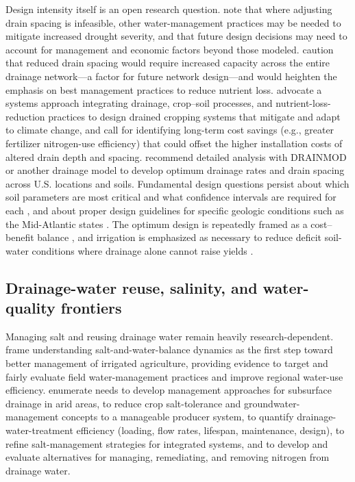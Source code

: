 Design intensity itself is an open research question. \textcite{Dialameh2025} note that where adjusting drain spacing is infeasible, other water-management practices may be needed to mitigate increased drought severity, and that future design decisions may need to account for management and economic factors beyond those modeled. \textcite{Singh2009} caution that reduced drain spacing would require increased capacity across the entire drainage network---a factor for future network design---and would heighten the emphasis on best management practices to reduce nutrient loss. \textcite{Castellano2019} advocate a systems approach integrating drainage, crop--soil processes, and nutrient-loss-reduction practices to design drained cropping systems that mitigate and adapt to climate change, and call for identifying long-term cost savings (e.g., greater fertilizer nitrogen-use efficiency) that could offset the higher installation costs of altered drain depth and spacing. \textcite{Strock2011} recommend detailed analysis with DRAINMOD or another drainage model to develop optimum drainage rates and drain spacing across U.S. locations and soils. Fundamental design questions persist about which soil parameters are most critical and what confidence intervals are required for each \parencite{Ayars2015}, and about proper design guidelines for specific geologic conditions such as the Mid-Atlantic states \parencite{SHIRMOHAMMADI1995}. The optimum design is repeatedly framed as a cost--benefit balance \parencite{HARDJOAMIDJOJO1982}, and irrigation is emphasized as necessary to reduce deficit soil-water conditions where drainage alone cannot raise yields \parencite{HARDJOAMIDJOJO1982}.

\subsection{Drainage-water reuse, salinity, and water-quality frontiers}
Managing salt and reusing drainage water remain heavily research-dependent. \textcite{Jia2007} frame understanding salt-and-water-balance dynamics as the first step toward better management of irrigated agriculture, providing evidence to target and fairly evaluate field water-management practices and improve regional water-use efficiency. \textcite{Ayars2015} enumerate needs to develop management approaches for subsurface drainage in arid areas, to reduce crop salt-tolerance and groundwater-management concepts to a manageable producer system, to quantify drainage-water-treatment efficiency (loading, flow rates, lifespan, maintenance, design), to refine salt-management strategies for integrated systems, and to develop and evaluate alternatives for managing, remediating, and removing nitrogen from drainage water.

